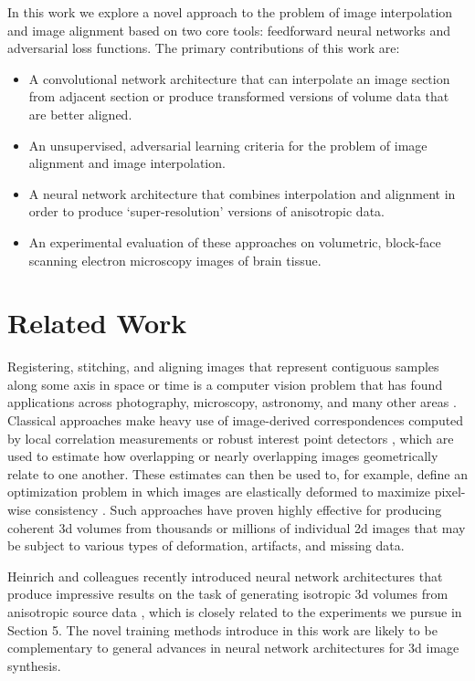 \documentclass{article} %
\begin{document}
In this work we explore a novel approach to the problem of image interpolation and image alignment based on two core tools: feedforward neural networks and adversarial loss functions. The primary contributions of this work are:

\begin{itemize}
\item A convolutional network architecture that can interpolate an image section from adjacent section or produce transformed versions of volume data that are better aligned. 
\item An unsupervised, adversarial learning criteria for the problem of image alignment and image interpolation.
\item A neural network architecture that combines interpolation and alignment in order to produce `super-resolution' versions of  anisotropic data. 
\item An experimental evaluation of these approaches on volumetric, block-face scanning electron microscopy images of brain tissue. 
\end{itemize}

\section{Related Work}
Registering, stitching, and aligning images that represent contiguous samples along some axis in space or time is a computer vision problem that has found  applications across photography, microscopy, astronomy, and many other areas \cite{szeliski2010computer}. Classical approaches make heavy use of image-derived correspondences computed by local correlation measurements or robust interest point detectors \cite{Lowe:2004}, which are used to estimate how overlapping or nearly overlapping images geometrically relate to one another. These estimates can then be used to, for example, define an optimization problem in which images are elastically deformed to maximize pixel-wise consistency \cite{saalfeld2012elastic}. Such approaches have proven highly effective for producing coherent 3d volumes from thousands or millions of individual 2d images that may be subject to various types of deformation, artifacts, and missing data. 

Heinrich and colleagues recently introduced neural network architectures that produce impressive results on the task of generating isotropic 3d volumes from anisotropic source data \cite{heinrich2017deep}, which is closely related to the experiments we pursue in Section 5. The novel training methods introduce in this work are likely to be complementary to general advances in neural network architectures for 3d image synthesis.
\end{document}
